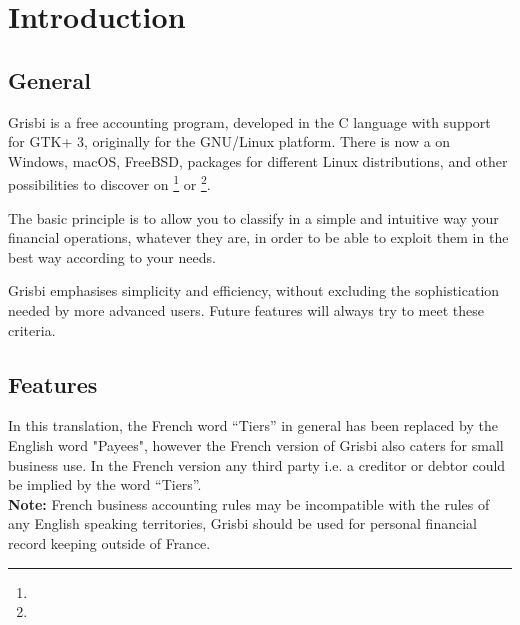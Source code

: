 







\chapter{Introduction\label{introduction}}

\section{General \label{introduction-General}}

Grisbi is a free accounting program, developed in the \gls{C} language with support for \gls{GTK}+ 3, originally for the \gls{GNU/Linux} platform. There is now a  on \gls{Windows}, \gls{macOS}, FreeBSD, packages for different  \gls{Linux distributions}, and other possibilities to discover on \footnote{\urlGrisbi{}} or \footnote{\urlSourceForge{}}.

The basic principle is to allow you to classify in a simple and intuitive way your financial operations, whatever they are, in order to be able to exploit them in the best way according to your needs.

Grisbi emphasises simplicity and efficiency, without excluding the sophistication needed by more advanced users. Future features will always try to meet these criteria.

\section{Features\label{introduction-features}}

 In this translation, the French word ``Tiers'' in general has been replaced by the English word "Payees", however the French version of Grisbi also caters for small business use. In the French version any third party i.e. a creditor or debtor could be implied by the word ``Tiers''.\\
\textbf{Note:} French business accounting rules may be incompatible with the rules of any English speaking territories, Grisbi should be used  for personal financial record keeping outside of France.



